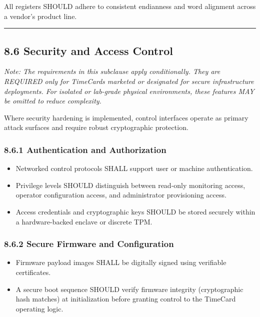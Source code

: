\documentclass[
]{article}
\begin{document}
All registers SHOULD adhere to consistent endianness and word alignment
across a vendor's product line.

\begin{center}\rule{0.5\linewidth}{0.5pt}\end{center}

\subsection{8.6 Security and Access
Control}\label{security-and-access-control}

\emph{Note: The requirements in this subclause apply conditionally. They
are REQUIRED only for TimeCards marketed or designated for secure
infrastructure deployments. For isolated or lab-grade physical
environments, these features MAY be omitted to reduce complexity.}

Where security hardening is implemented, control interfaces operate as
primary attack surfaces and require robust cryptographic protection.

\subsubsection{8.6.1 Authentication and
Authorization}\label{authentication-and-authorization}

\begin{itemize}
\item
  Networked control protocols SHALL support user or machine
  authentication.
\item
  Privilege levels SHOULD distinguish between read-only monitoring
  access, operator configuration access, and administrator provisioning
  access.
\item
  Access credentials and cryptographic keys SHOULD be stored securely
  within a hardware-backed enclave or discrete TPM.
\end{itemize}

\subsubsection{8.6.2 Secure Firmware and
Configuration}\label{secure-firmware-and-configuration}

\begin{itemize}
\item
  Firmware payload images SHALL be digitally signed using verifiable
  certificates.
\item
  A secure boot sequence SHOULD verify firmware integrity (cryptographic
  hash matches) at initialization before granting control to the
  TimeCard operating logic.
\end{itemize}
\end{document}
